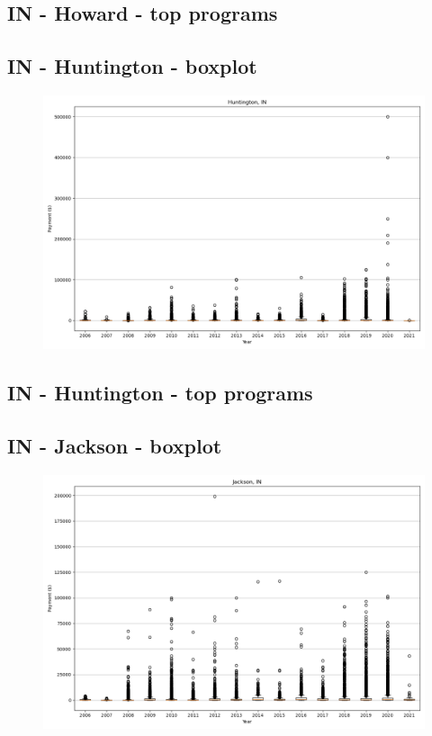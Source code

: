 \subsection*{IN - Howard - top programs}

\newpage
\subsection*{IN - Huntington - boxplot}
\begin{figure}[h]
\centering
\includegraphics[width=7in]{../output/boxplots/counties/Huntington-IN_boxplot.png}
\end{figure}


\subsection*{IN - Huntington - top programs}

\newpage
\subsection*{IN - Jackson - boxplot}
\begin{figure}[h]
\centering
\includegraphics[width=7in]{../output/boxplots/counties/Jackson-IN_boxplot.png}
\end{figure}


